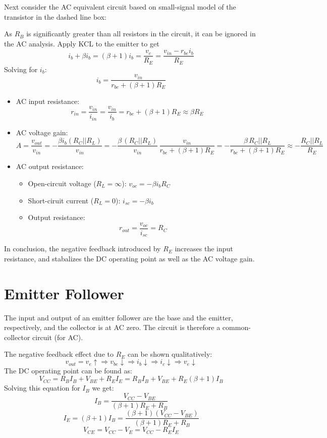 \begin{itemize}
Next consider the AC equivalent circuit based on small-signal model of the
transistor in the dashed line box:


As $R_B$ is significantly greater than all resistors in the circuit, it can
be ignored in the AC analysis. Apply KCL to the emitter to get
\[
i_b+\beta i_b=(\beta+1)i_b=\frac{v_e}{R_E}=\frac{v_{in}-r_{be}i_b}{R_E}
\]
Solving for $i_b$:
\[
i_b=\frac{v_{in}}{r_{be}+(\beta+1)R_E}
\]
\begin{itemize}
\item AC input resistance:
  \[
  r_{in}=\frac{v_{in}}{i_{in}}=\frac{v_{in}}{i_b}=r_{be}+(\beta+1)R_E
  \approx \beta R_E
  \]
\item AC voltage gain:
  \[
  A=\frac{v_{out}}{v_{in}}=-\frac{\beta i_b (R_C||R_L)}{v_{in}}
  =-\frac{\beta\,(R_C||R_L)}{v_{in}}\,\frac{v_{in}}{r_{be}+(\beta+1)R_E} 
  =-\frac{\beta\,R_C||R_L}{r_{be}+(\beta+1)R_E}
  \approx -\frac{R_C||R_L}{R_E}
  \]
\item AC output resistance:
  \begin{itemize}
  \item Open-circuit voltage ($R_L=\infty$):
    $v_{oc}=-\beta i_b R_C$
  \item Short-ciruit current ($R_L=0$):
    $i_{sc}=-\beta i_b$
  \item Output resistance:
    \[
    r_{out}=\frac{v_{oc}}{i_{sc}}=R_C
    \]
  \end{itemize}
\end{itemize}
In conclusion, the negative feedback introduced by $R_E$ increases the 
input resistance, and stabalizes the DC operating point as well as the 
AC voltage gain.


\section*{Emitter Follower}

The input and output of an emitter follower are the base and the 
emitter, respectively, and the collector is at AC zero. The circuit 
is therefore a common-collector circuit (for AC).



The negative feedback effect due to $R_E$ can be shown qualitatively:
\[
v_{out}=v_e\uparrow \Longrightarrow v_{be} \downarrow \Longrightarrow 
i_b \downarrow \Longrightarrow i_c \downarrow \Longrightarrow 
v_e\downarrow
\]
The DC operating point can be found as:
\[ 
V_{CC}=R_B I_B+V_{BE}+R_E I_E=R_B I_B+V_{BE}+R_E (\beta+1)I_B
\]
Solving this equation for $I_B$ we get:
\[
I_B=\frac{V_{CC}-V_{BE}}{(\beta+1)R_E+R_B} 
\]
\[
I_E=(\beta+1) I_B=\frac{(\beta+1)(V_{CC}-V_{BE})}{(\beta+1)R_E+R_B} 
\]
\[
V_{CE}=V_{CC}-V_E=V_{CC}-R_E I_E 
\]


\end{itemize}
